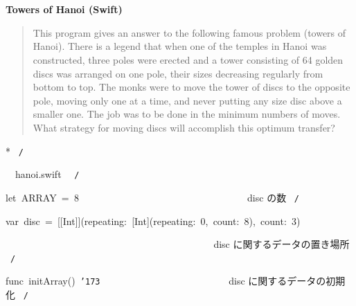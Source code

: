 \documentclass[a4paper,10pt]{article}
\def\mc{\relax}
\begin{document}
\tt\mc 

\noindent
\mbox{}\rm\mc {\tt /}{\tt *}\  \hrulefill *


\ %

\centerline{\bf Towers of Hanoi (Swift)}

\begin{quote}

This program gives an answer to the following famous problem (towers of
Hanoi).
There is a legend that when one of the temples in Hanoi was constructed,
three poles were erected and a tower consisting of 64 golden discs was
arranged on one pole, their sizes decreasing regularly from bottom to top.
The monks were to move the tower of discs to the opposite pole, moving
only one at a time, and never putting any size disc above a smaller one.
The job was to be done in the minimum numbers of moves. What strategy for
moving discs will accomplish this optimum transfer?
\end{quote}


* \hrulefill \rm\mc \ {\tt *}{\tt /}
\tt\mc 

\noindent
\mbox{}\hfill

\noindent
\mbox{}\hfill

\noindent
\mbox{}\rm\mc {\tt /}{\tt *}\  \hrulefill\ hanoi.swift \ \hrulefill \rm\mc \ {\tt *}{\tt /}
\tt\mc 

\noindent
\mbox{}\hfill

\noindent
\mbox{}\hfill

\noindent
\mbox{}let{\tt\mc \ }ARRAY{\tt\mc \ }={\tt\mc \ }8{\tt\mc \ \ \ \ \ \ \ \ }{\tt\mc \ \ \ \ \ \ \ \ }{\tt\mc \ \ \ \ \ \ \ \ }{\tt\mc \ \ \ \ \ \ \ \ }\rm\mc {\tt /}{\tt *}\  \ disc の数 \hfill \rm\mc \ {\tt *}{\tt /}
\tt\mc 

\noindent
\mbox{}\hfill

\noindent
\mbox{}var{\tt\mc \ }disc{\tt\mc \ }={\tt\mc \ }[[Int]](repeating:{\tt\mc \ }[Int](repeating:{\tt\mc \ }0,{\tt\mc \ }count:{\tt\mc \ }8),{\tt\mc \ }count:{\tt\mc \ }3)

\noindent
\mbox{}{\tt\mc \ \ \ \ \ \ \ \ }{\tt\mc \ \ \ \ \ \ \ \ }{\tt\mc \ \ \ \ \ \ \ \ }{\tt\mc \ \ \ \ \ \ \ \ }{\tt\mc \ \ \ \ \ \ \ \ }\rm\mc {\tt /}{\tt *}\  \ disc に関するデータの置き場所
					   \hfill \rm\mc \ {\tt *}{\tt /}
\tt\mc 

\noindent
\mbox{}\hfill

\noindent
\mbox{}func{\tt\mc \ }initArray(){\tt\mc \ }{\tt\char'173}{\tt\mc \ \ \ \ \ \ \ \ }{\tt\mc \ \ \ \ \ \ \ \ }{\tt\mc \ \ \ \ \ \ \ \ }\rm\mc {\tt /}{\tt *}\  \ disc に関するデータの初期化
					   \hfill \rm\mc \ {\tt *}{\tt /}
\tt\mc 
\end{document}
